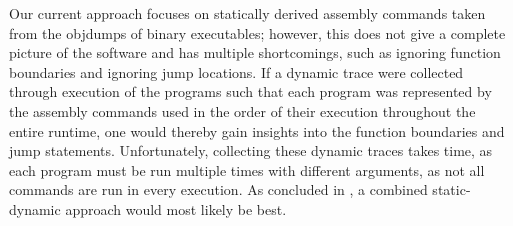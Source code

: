 Our current approach focuses on statically derived assembly commands taken from the objdumps of binary executables; however, this does not give a complete picture of the software and has multiple shortcomings, such as ignoring function boundaries and ignoring jump locations. If a dynamic trace were collected through execution of the programs such that each program was represented by the assembly commands used in the order of their execution throughout the entire runtime, one would thereby gain insights into the function boundaries and jump statements. Unfortunately, collecting these dynamic traces takes time, as each program must be run multiple times with different arguments, as not all commands are run in every execution. As concluded in \cite{santos2013opem}, a combined static-dynamic approach would most likely be best.